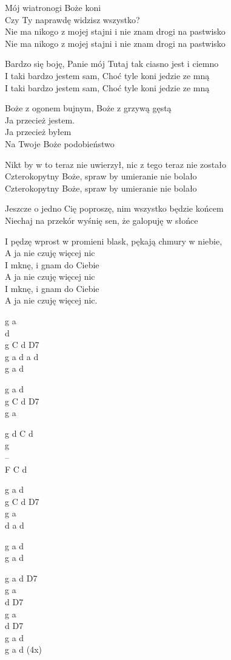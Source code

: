 \begin{text}
    \small{
Mój wiatronogi Boże koni\\
Czy Ty naprawdę widzisz wszystko?\\
Nie ma nikogo z mojej stajni i nie znam drogi na pastwisko\\
Nie ma nikogo z mojej stajni i nie znam drogi na pastwisko

\hfill\break
Bardzo się boję, Panie mój Tutaj tak ciasno jest i ciemno\\
I taki bardzo jestem sam, Choć tyle koni jedzie ze mną\\
I taki bardzo jestem sam, Choć tyle koni jedzie ze mną

Boże z ogonem bujnym, Boże z grzywą gęstą\\
Ja przecież jestem.\\
Ja przecież byłem\\
Na Twoje Boże podobieństwo

Nikt by w to teraz nie uwierzył, nic z tego teraz nie zostało\\
Czterokopytny Boże, spraw by umieranie nie bolało\\
Czterokopytny Boże, spraw by umieranie nie bolało

\hfill\break
Jeszcze o jedno Cię poproszę, nim wszystko będzie końcem\\
Niechaj na przekór wyśnię sen, że galopuję w słońce

I pędzę wprost w promieni blask, pękają chmury w niebie,\\
A ja nie czuję więcej nic\\
I mknę, i gnam do Ciebie\\
A ja nie czuję więcej nic\\
I mknę, i gnam do Ciebie\\
A ja nie czuję więcej nic.
}
\end{text}
\begin{chord}
\small{
g a\\
d\\
g C d D7\\
g a d a d\\
g a d

g a d\\
g C d D7\\
g a

g d C d\\
g\\
--\\
F C d

g a d\\
g C d D7\\
g a\\
d a d

g a d\\
g a d

g a d D7\\
g a\\
d D7\\
g a\\
d D7\\
g a d\\
g a d (4x)
}
\end{chord}
